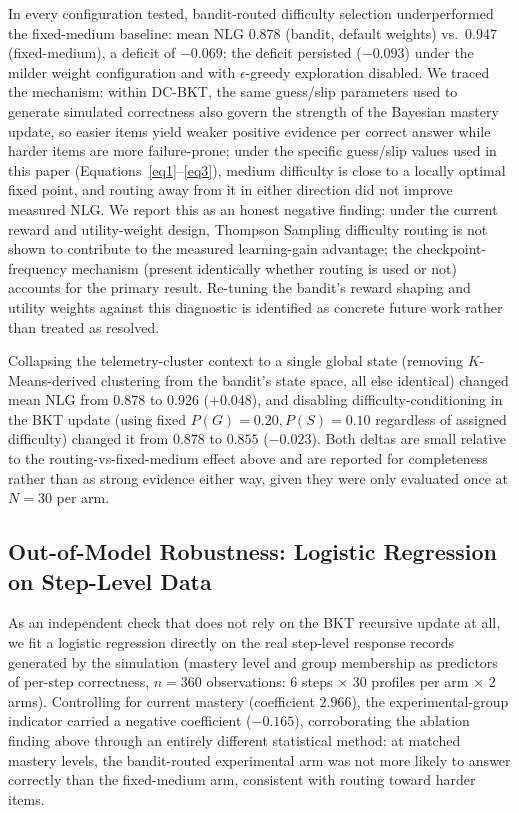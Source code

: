\documentclass[pdflatex,sn-apa]{sn-jnl}
\begin{document}
In every configuration tested, bandit-routed difficulty selection underperformed the fixed-medium baseline: mean NLG $0.878$ (bandit, default weights) vs.\ $0.947$ (fixed-medium), a deficit of $-0.069$; the deficit persisted ($-0.093$) under the milder weight configuration and with $\epsilon$-greedy exploration disabled. We traced the mechanism: within DC-BKT, the same guess/slip parameters used to generate simulated correctness also govern the strength of the Bayesian mastery update, so easier items yield weaker positive evidence per correct answer while harder items are more failure-prone; under the specific guess/slip values used in this paper (Equations~\ref{eq1}--\ref{eq3}), medium difficulty is close to a locally optimal fixed point, and routing away from it in either direction did not improve measured NLG. We report this as an honest negative finding: under the current reward and utility-weight design, Thompson Sampling difficulty routing is not shown to contribute to the measured learning-gain advantage; the checkpoint-frequency mechanism (present identically whether routing is used or not) accounts for the primary result. Re-tuning the bandit's reward shaping and utility weights against this diagnostic is identified as concrete future work rather than treated as resolved.

Collapsing the telemetry-cluster context to a single global state (removing $K$-Means-derived clustering from the bandit's state space, all else identical) changed mean NLG from $0.878$ to $0.926$ ($+0.048$), and disabling difficulty-conditioning in the BKT update (using fixed $P(G)=0.20, P(S)=0.10$ regardless of assigned difficulty) changed it from $0.878$ to $0.855$ ($-0.023$). Both deltas are small relative to the routing-vs-fixed-medium effect above and are reported for completeness rather than as strong evidence either way, given they were only evaluated once at $N=30$ per arm.

\subsection{Out-of-Model Robustness: Logistic Regression on Step-Level Data}\label{sec5.6}

As an independent check that does not rely on the BKT recursive update at all, we fit a logistic regression directly on the real step-level response records generated by the simulation (mastery level and group membership as predictors of per-step correctness, $n=360$ observations: 6 steps $\times$ 30 profiles per arm $\times$ 2 arms). Controlling for current mastery (coefficient $2.966$), the experimental-group indicator carried a negative coefficient ($-0.165$), corroborating the ablation finding above through an entirely different statistical method: at matched mastery levels, the bandit-routed experimental arm was not more likely to answer correctly than the fixed-medium arm, consistent with routing toward harder items.
\end{document}
